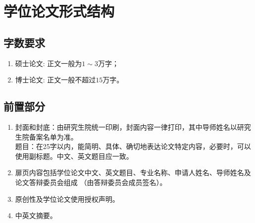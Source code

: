 
\chapter{学位论文形式结构}

\section{字数要求}
\begin{enumerate}
    \item 硕士论文: 正文一般为$1 \sim 3$万字；
    \item 博士论文: 正文一般不超过$15$万字。
\end{enumerate}


\section{前置部分}

\begin{enumerate}
    \item 封面和封底：由研究生院统一印刷，封面内容一律打印，其中导师姓名以研究生院备案名单为准。\\
          题目：在25字以内，能简明、具体、确切地表达论文特定内容，必要时，可以使用副标题。中文、英文题目应一致。
      \item 扉页内容包括学位论文中文、英文题目、专业名称、申请人姓名、导师姓名及论文答辩委员会组成 （由答辩委员会成员签名）。
      \item 原创性及学位论文使用授权声明。
      \item 中英文摘要。
\end{enumerate}


